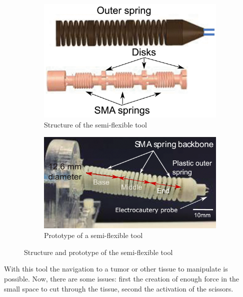 \begin{figure}[H]
    \centering
    \begin{subfigure}[b]{0.45\textwidth}
        \includegraphics[width=\textwidth]{Figures/springbasedconstruction.png}
        \caption{Structure of the semi-flexible tool}
        \label{fig:springsbasedconstrucion}
    \end{subfigure}
    \qquad
    \begin{subfigure}[b]{0.45\textwidth}
        \includegraphics[width=\textwidth]{Figures/prototype.png}
        \caption{Prototype of a semi-flexible tool}
        \label{fig:prototype}
    \end{subfigure}
    \caption{Structure and prototype of the semi-flexible tool \cite{StiffnessTuning}}
    \label{fig:structure_prototype}
\end{figure}
With this tool the navigation to a tumor or other tissue to manipulate is possible. Now, there are some issues: first the creation of enough force in the small space to cut through the tissue, second the activation of the scissors.\\
